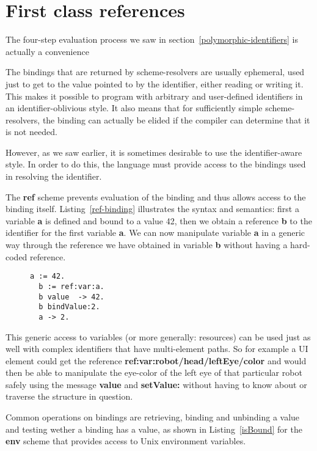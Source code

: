 \documentclass[preprint,authoryear]{acm_proc_article-sp}
\newcommand\mpw[1]{\mynote{Marcel}{#1}}
\begin{document}
\mpw{no changes yet beyond this point}

\section{First class references}
\label{references}
The four-step evaluation process we saw in section~\ref{polymorphic-identifiers} is
actually a convenience 

The bindings that are returned by scheme-resolvers are usually ephemeral, used just 
to get to the value pointed to by the identifier, either reading or writing it.  This
makes it possible to program with arbitrary and user-defined identifiers in
an identifier-oblivious style.  It also means that for sufficiently simple scheme-resolvers,
the binding can actually be elided if the compiler can determine that it is not needed.

However, as we saw earlier, it is sometimes
desirable to use the identifier-aware style.  In order to do this, the language
must provide access to the bindings used in resolving the identifier.

The {\bf ref} scheme prevents evaluation of the binding and thus allows access
to the binding itself.  Listing~\ref{ref-binding} illustrates the syntax and semantics:
first a variable {\bf a} is defined and bound to a value 42, then we obtain a reference {\bf b} to
the identifier for the first variable {\bf a}.  We can now manipulate variable {\bf a} 
in a generic way through the reference we have obtained in variable {\bf b} without
having a hard-coded reference. 


\begin{figure}[htbp]
\begin{lstlisting}[style=L,label=ref-binding,caption=Accessing a variable via its binding.]
  a := 42.
  b := ref:var:a.
  b value  -> 42.
  b bindValue:2.
  a -> 2.
\end{lstlisting}
\end{figure}

This generic access to variables (or more generally: resources) can be used just as well
with complex identifiers that have multi-element paths.  So for example a UI element
could get the reference {\bf ref:var:robot/head/leftEye/color} and would then be
able to manipulate the eye-color of the left eye of that particular robot safely using
the message {\bf value} and {\bf setValue:}
without having to know about or traverse the structure in question.

Common operations on bindings are retrieving, binding and unbinding a value and testing 
wether a binding has a value, as shown in Listing~\ref{isBound} for the {\bf env} scheme
that provides access to Unix environment variables.
\end{document}
